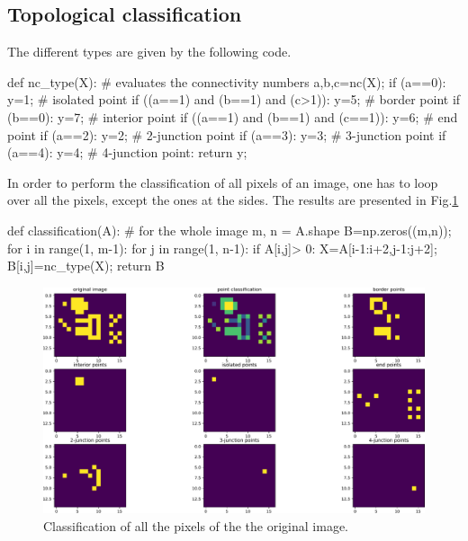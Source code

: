 \subsection{Topological classification}
The different types are given by the following code.
\begin{python}
def nc_type(X):
    # evaluates the connectivity numbers
    a,b,c=nc(X);
    if (a==0):
        y=1; # isolated point
    if ((a==1) and (b==1) and (c>1)): 
        y=5;  # border point
    if (b==0):
        y=7;  # interior point
    if ((a==1) and (b==1) and (c==1)):
        y=6;  # end point
    if (a==2):
        y=2;  # 2-junction point
    if (a==3):
        y=3;  # 3-junction point
    if (a==4):
        y=4;  # 4-junction point:
    return y; 
\end{python}
In order to perform the classification of all pixels of an image, one has to loop over all the pixels, except the ones at the sides. The results are presented in Fig.\ref{fig:topological_description:python:classification}

\begin{python}
def classification(A):
     # for the whole image
    m, n = A.shape
    B=np.zeros((m,n));
    for i in range(1, m-1):
        for j in range(1, n-1):
            if A[i,j]> 0:
                X=A[i-1:i+2,j-1:j+2];
                B[i,j]=nc_type(X);
    return B
\end{python}

\begin{figure}[htbp]
\centering
\includegraphics[width=\textwidth]{classif.pdf}
\caption{Classification of all the pixels of the the original image.}
\label{fig:topological_description:python:classification}
\end{figure}
